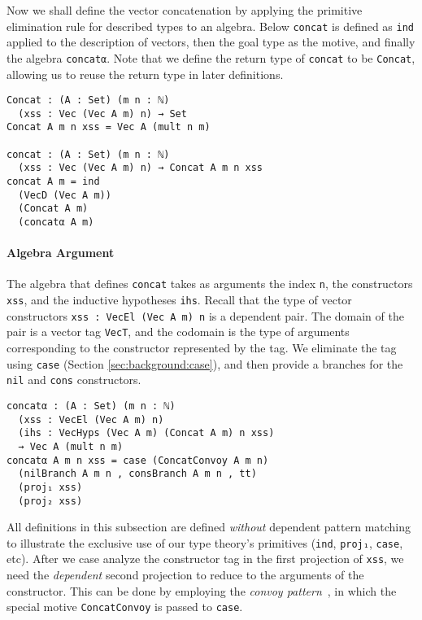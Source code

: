 \documentclass[nonatbib]{sigplanconf}
\newcommand{\refsec}[1]{Section \ref{sec:#1}}
\begin{document}
Now we shall define the vector concatenation by applying the primitive
elimination rule for described types to an algebra. Below
{\tt concat} is defined as {\tt ind} applied to the description of
vectors, then the goal type as the motive, and finally the algebra
{\tt concatα}.
Note that we define the return type of
{\tt concat} to be {\tt Concat}, allowing us to reuse the return type
in later definitions.

\begin{verbatim}
Concat : (A : Set) (m n : ℕ)
  (xss : Vec (Vec A m) n) → Set
Concat A m n xss = Vec A (mult n m)

concat : (A : Set) (m n : ℕ)
  (xss : Vec (Vec A m) n) → Concat A m n xss
concat A m = ind
  (VecD (Vec A m))
  (Concat A m)
  (concatα A m)
\end{verbatim}

\paragraph{Algebra Argument}

The algebra that defines {\tt concat} takes as arguments the index
{\tt n}, the constructors {\tt xss}, and the inductive hypotheses
{\tt ihs}. Recall that the type of vector constructors
{\tt xss : VecEl (Vec A m) n} is a dependent pair. The domain of the
pair is a vector tag {\tt VecT}, and the codomain is the type of
arguments corresponding to the constructor represented by the tag. We
eliminate the tag using {\tt case} (\refsec{background:case}), and
then provide a branches for the {\tt nil} and {\tt cons} constructors.

\begin{verbatim}
concatα : (A : Set) (m n : ℕ)
  (xss : VecEl (Vec A m) n)
  (ihs : VecHyps (Vec A m) (Concat A m) n xss)
  → Vec A (mult n m)
concatα A m n xss = case (ConcatConvoy A m n)
  (nilBranch A m n , consBranch A m n , tt)
  (proj₁ xss)
  (proj₂ xss)
\end{verbatim}

All definitions in this subsection are defined {\it without} dependent
pattern matching to illustrate the exclusive use of our type theory's
primitives ({\tt ind}, {\tt proj₁}, {\tt case}, etc). After we case
analyze the constructor tag in the first projection of {\tt xss}, we
need the {\it dependent} second projection to reduce to the arguments
of the constructor. This can be done by employing the
{\it convoy pattern}~\citep{chlipala2011certified}, in which the special motive
{\tt ConcatConvoy} is passed to {\tt case}.
\end{document}
